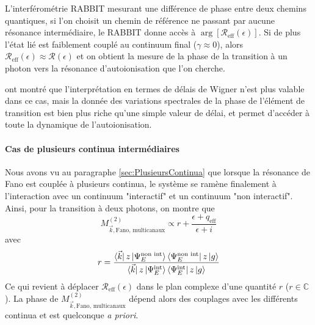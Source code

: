 L'interférométrie RABBIT mesurant une différence de phase entre deux chemins quantiques, si l'on choisit un chemin de référence ne passant par aucune résonance intermédiaire, le RABBIT donne accès à $\arg [\mathcal{R}_{\text{eff}}(\epsilon)]$. Si de plus l'état lié est faiblement couplé au continuum final ($\gamma \approx 0$), alors $\mathcal{R}_{\text{eff}}(\epsilon) \approx \mathcal{R}(\epsilon)$ et on obtient la mesure de la phase de la transition à un photon vers la résonance d'autoionisation que l'on cherche. 

 ont montré que l'interprétation en termes de délais de Wigner n'est plus valable dans ce cas, mais la donnée des variations spectrales de la phase de l'élément de transition est bien plus riche qu'une simple valeur de délai, et permet d'accéder à toute la dynamique de l'autoionisation.

\paragraph*{Cas de plusieurs continua intermédiaires} Nous avons vu au paragraphe \ref{sec:PlusieursContinua} que lorsque la résonance de Fano est couplée à plusieurs continua, le système se ramène finalement à l'interaction avec un continuum "interactif" et un continuum "non interactif". Ainsi, pour la transition à deux photons, on montre que
\begin{equation}
M_{\vec{k}, \text{Fano, multicanaux}}^{(2)} \propto r + \frac{\epsilon + q_{\text{eff}}}{\epsilon + i}
\end{equation}
avec 
\begin{equation}
r = \frac{\bra{\vec{k}} z \ket{\Psi_E^{\text{non int}}} \bra{\Psi_E^{\text{non int}}} z \ket{g}}{\bra{\vec{k}} z \ket{\Psi_E^{\text{int}}} \bra{\Psi_E^{\text{int}}} z \ket{g}}
\end{equation}
Ce qui revient à déplacer $\mathcal{R}_{\text{eff}}(\epsilon)$ dans le plan complexe d'une quantité $r$ ($r \in \mathbb{C}$). La phase de $M_{\vec{k}, \text{Fano, multicanaux}}^{(2)}$ dépend alors des couplages avec les différents continua et est quelconque \textit{a priori}.


